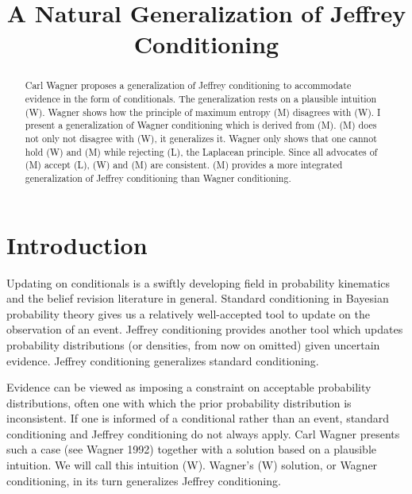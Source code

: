\documentclass[12pt]{article}
\begin{document}
\doublespacing

\title{A Natural Generalization of Jeffrey Conditioning}


\maketitle


\begin{abstract} 
  {\noindent}Carl Wagner proposes a generalization of Jeffrey
  conditioning to accommodate evidence in the form of conditionals.
  The generalization rests on a plausible intuition (W). Wagner shows
  how the principle of maximum entropy (M) disagrees with (W). I
  present a generalization of Wagner conditioning which is derived
  from (M). (M) does not only not disagree with (W), it generalizes
  it. Wagner only shows that one cannot hold (W) and (M) while
  rejecting (L), the Laplacean principle. Since all advocates of (M)
  accept (L), (W) and (M) are consistent. (M) provides a more
  integrated generalization of Jeffrey conditioning than Wagner
  conditioning.
\end{abstract}

\newpage

\section{Introduction}
\label{Introduction}

Updating on conditionals is a swiftly developing field in probability
kinematics and the belief revision literature in general. Standard
conditioning in Bayesian probability theory gives us a relatively
well-accepted tool to update on the observation of an event. Jeffrey
conditioning provides another tool which updates probability
distributions (or densities, from now on omitted) given uncertain
evidence. Jeffrey conditioning generalizes standard conditioning.

Evidence can be viewed as imposing a constraint on acceptable
probability distributions, often one with which the prior probability
distribution is inconsistent. If one is informed of a conditional
rather than an event, standard conditioning and Jeffrey conditioning
do not always apply. Carl Wagner presents such a case (see
Wagner 1992) together with a solution based on a plausible
intuition. We will call this intuition (W). Wagner's (W) solution, or
Wagner conditioning, in its turn generalizes Jeffrey conditioning.
\end{document}
